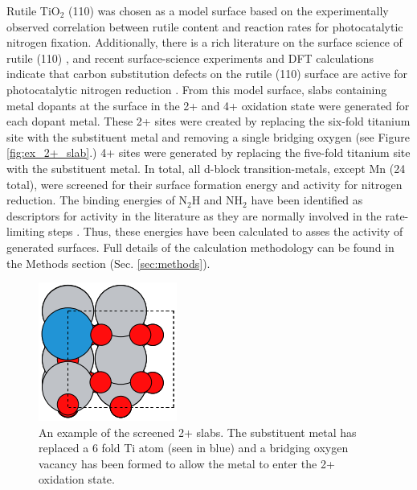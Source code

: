 Rutile TiO$_2$ (110) was chosen as a model surface based on the experimentally observed correlation between rutile content and reaction rates for photocatalytic nitrogen fixation\cite{Schrauzer_1977}. Additionally, there is a rich literature on the surface science of rutile (110) \cite{Diebold_2003, Yates_1991, Lu1994, Walle2009}, and recent surface-science experiments and DFT calculations indicate that carbon substitution defects on the rutile (110) surface are active for photocatalytic nitrogen reduction \cite{Comer_2018b}. From this model surface, slabs containing metal dopants at the surface in the 2+ and 4+ oxidation state were generated for each dopant metal. These 2+ sites were created by replacing the six-fold titanium site with the substituent metal and removing a single bridging oxygen (see Figure \ref{fig:ex_2+_slab}.) 4+ sites were generated by replacing the five-fold titanium site with the substituent metal. 
In total, all d-block transition-metals, except Mn (24 total), were screened for their surface formation energy and activity for nitrogen reduction.  The binding energies of N$_2$H and NH$_2$ have been identified as descriptors for activity in the literature as they are normally involved in the rate-limiting steps \cite{Hoskuldsson_2017, Montoya_2015, Comer_2018}. Thus, these energies have been calculated to asses the activity of generated surfaces.  Full details of the calculation methodology can be found in the Methods section (Sec. \ref{sec:methods}).


\begin{figure}
    \centering
    \includegraphics[width=0.5\linewidth]{Images/ex_2+_slab.png}
    \caption{An example of the screened 2+ slabs. The substituent metal has replaced a 6 fold Ti atom (seen in blue) and a bridging oxygen vacancy has been formed to allow the metal to enter the 2+ oxidation state.}
    \label{fig:2+_ex_slab}
\end{figure}

